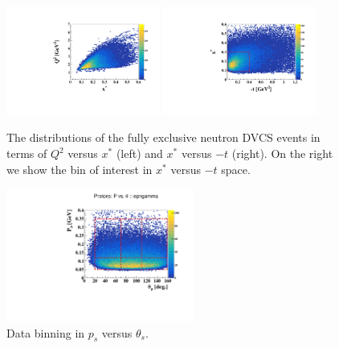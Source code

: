 \begin{figure}[htb]
  \centering
    \includegraphics[width=0.45\textwidth,clip]{figs_epngamma/pdf/epngamma_Q2_x*.pdf}
    \includegraphics[width=0.45\textwidth,clip]{figs_epngamma/pdf/epngamma_t_x*.pdf}
   \caption{The distributions of the fully exclusive neutron DVCS events in 
   terms of $Q^2$ versus $x^*$ (left) and  $x^{*}$ versus $-t$ (right). On the 
   right we show the bin of interest in $x^{*}$ versus $-t$ space.
   \label{fig:exclusive_binning_x_t}}
\end{figure}



\begin{figure}[htb]
  \centering
\includegraphics[width=0.55\textwidth,clip,trim=0mm 0mm 0mm 
   20mm]{figs_epngamma/pdf/epngamma_p_p_theta.pdf}
  \caption{Data binning in $p_s$ versus $\theta_s$.
   \label{fig:binning_x_t}}
\end{figure}


